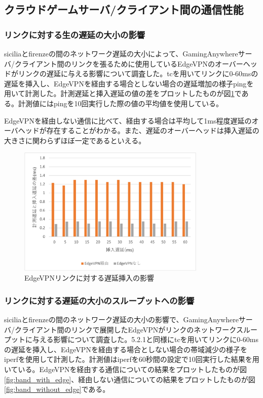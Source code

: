 \subsection{クラウドゲームサーバ/クライアント間の通信性能}

\subsubsection{リンクに対する生の遅延の大小の影響}
siciliaとfirenzeの間のネットワーク遅延の大小によって、GamingAnywhereサーバ/クライアント間のリンクを張るために使用しているEdgeVPNのオーバーヘッドがリンクの遅延に与える影響について調査した。tc\cite{iproute2}を用いてリンクに0-60msの遅延を挿入し、EdgeVPNを経由する場合としない場合の遅延増加の様子ping\cite{ping}を用いて計測した。計測遅延と挿入遅延の値の差をプロットしたものが図\ref{fig:ratency}である。計測値にはpingを10回実行した際の値の平均値を使用している。

EdgeVPNを経由しない通信に比べて、経由する場合は平均して1ms程度遅延のオーバヘッドが存在することがわかる。また、遅延のオーバーヘッドは挿入遅延の大きさに関わらずほぼ一定であるといえる。

\begin{figure}[t]
    \centering
    \includegraphics[width=0.8\textwidth,keepaspectratio,clip]{img/graph_ratency.pdf}
    \caption{EdgeVPNリンクに対する遅延挿入の影響}
    \label{fig:ratency}
\end{figure}

\subsubsection{リンクに対する遅延の大小のスループットへの影響}
siciliaとfirenzeの間のネットワーク遅延の大小の影響で、GamingAnywhereサーバ/クライアント間のリンクで展開したEdgeVPNがリンクのネットワークスループットに与える影響について調査した。5.2.1と同様にtcを用いてリンクに0-60msの遅延を挿入し、EdgeVPNを経由する場合としない場合の帯域減少の様子をiperf\cite{iperf}を使用して計測した。計測値はiperfを60秒間の設定で10回実行した結果を用いている。EdgeVPNを経由する通信についての結果をプロットしたものが図\ref{fig:band_with_edge}、経由しない通信についての結果をプロットしたものが図\ref{fig:band_without_edge}である。

